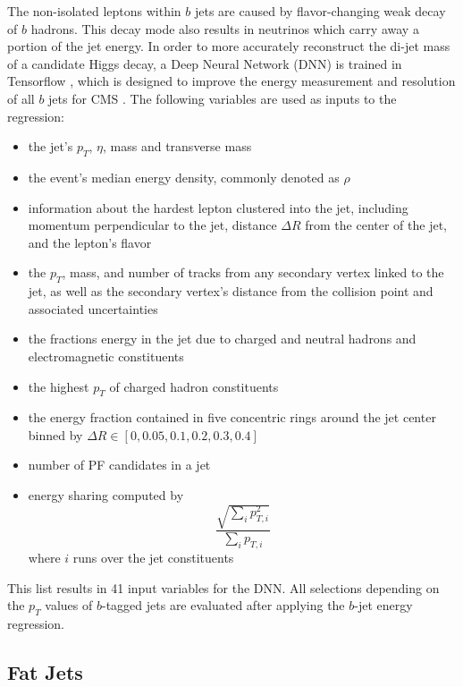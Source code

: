 The non-isolated leptons within $b$ jets are caused
by flavor-changing weak decay of $b$ hadrons.
This decay mode also results in neutrinos which carry away a portion of the jet energy.
In order to more accurately reconstruct the di-jet mass of a candidate Higgs decay,
a Deep Neural Network (DNN) is trained in Tensorflow
\cite{DBLP:journals/corr/AbadiABBCCCDDDG16},
which is designed to improve the energy measurement and resolution of all $b$ jets for CMS
\cite{collaboration2019deep}.
The following variables are used as inputs to the regression:
\begin{itemize}
\item the jet's $p_T$, $\eta$, mass and transverse mass
\item the event's median energy density, commonly denoted as $\rho$
\item information about the hardest lepton clustered into the jet,
  including momentum perpendicular to the jet,
  distance $\Delta R$ from the center of the jet,
  and the lepton's flavor
\item the $p_T$, mass, and number of tracks from any secondary vertex linked to the jet,
  as well as the secondary vertex's distance from the collision point and
  associated uncertainties
\item the fractions energy in the jet due to
  charged and neutral hadrons and electromagnetic constituents
\item the highest $p_T$ of charged hadron constituents
\item the energy fraction contained in five concentric rings around the jet center
  binned by $\Delta R \in [0, 0.05, 0.1, 0.2, 0.3, 0.4]$
\item number of PF candidates in a jet
\item energy sharing computed by
  \[
  \frac{\sqrt{\sum_i p_{T,i}^2}}{\sum_i p_{T,i}}
  \]
  where $i$ runs over the jet constituents
\end{itemize}
This list results in 41 input variables for the DNN.
All selections depending on the $p_T$ values of $b$-tagged jets are evaluated after
applying the $b$-jet energy regression.

\subsection{Fat Jets}

